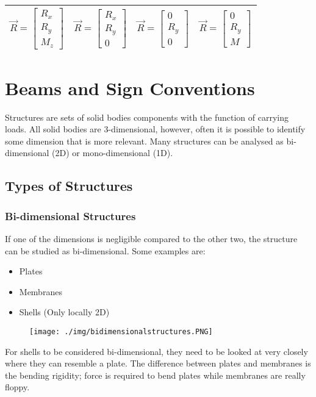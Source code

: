 \begin{center}
\begin{tabular}{ |c|c|c|c| }
    \hline
    $\vec{R} = \left[ \begin{array}{ccc} R_x \\ R_y \\ M_z \end{array}\right]$             & $\vec{R} = \left[ \begin{array}{ccc} R_x \\ R_y \\ 0 \end{array}\right]$                & $\vec{R} = \left[ \begin{array}{ccc} 0 \\ R_y \\ 0 \end{array}\right]$              & $\vec{R} = \left[ \begin{array}{ccc} 0 \\ R_y \\ M \end{array}\right]$               \\
    \hline
  \end{tabular}
\end{center}
\section{Beams and Sign Conventions}
Structures are sets of solid bodies components with the function of carrying loads. All solid bodies are 3-dimensional, however, often it is possible to identify some dimension that is more relevant. Many structures can be analysed as bi-dimensional (2D) or mono-dimensional (1D).
\subsection{Types of Structures}
\subsubsection{Bi-dimensional Structures}
If one of the dimensions is negligible compared to the other two, the
structure can be studied as bi-dimensional. Some examples are:
\begin{itemize}[noitemsep]
  \item Plates
  \item Membranes
  \item Shells (Only locally 2D)
\end{itemize}
\begin{figure}[H]
  \centering
  \texttt{[image: ./img/bidimensionalstructures.PNG]}
\end{figure}
For shells to be considered bi-dimensional, they need to be looked at very closely where they can resemble a plate. The difference between plates and membranes is the bending rigidity; force is required to bend plates while membranes are really floppy.
